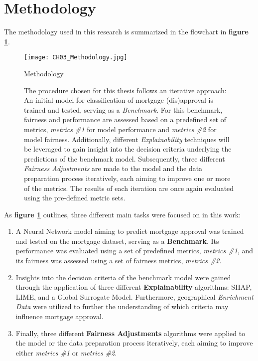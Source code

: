 \section{Methodology}\label{sec:Methodology}

The methodology used in this research is summarized in the flowchart in \textbf{figure \ref{fig:CH03_Methodology}}. 

\begin{figure}[h]
    \centering
    \texttt{[image: CH03\_Methodology.jpg]}
    \caption{Methodology}
    \caption*{The procedure chosen for this thesis follows an iterative approach: An initial model for classification of mortgage (dis)approval is trained and tested, serving as a \textit{Benchmark}. For this benchmark, fairness and performance are assessed based on a predefined set of metrics, \textit{metrics \#1} for model performance and \textit{metrics \#2} for model fairness. Additionally, different \textit{Explainability} techniques will be leveraged to gain insight into the decision criteria underlying the predictions of the benchmark model. Subsequently, three different \textit{Fairness Adjustments} are made to the model and the data preparation process iteratively, each aiming to improve one or more of the metrics. The results of each iteration are once again evaluated using the pre-defined metric sets.}
    \label{fig:CH03_Methodology}
\end{figure}

As \textbf{figure \ref{fig:CH03_Methodology}} outlines, three different main tasks were focused on in this work:

\begin{enumerate}
    \item A Neural Network model aiming to predict mortgage approval was trained and tested on the mortgage dataset, serving as a \textbf{Benchmark}. Its performance was evaluated using a set of predefined metrics, \textit{metrics \#1}, and its fairness was assessed using a set of fairness metrics, \textit{metrics \#2}.
    \item Insights into the decision criteria of the benchmark model were gained through the application of three different \textbf{Explainability} algorithms: SHAP, LIME, and a Global Surrogate Model. Furthermore, geographical \textit{Enrichment Data} were utilized to further the understanding of which criteria may influence mortgage approval.
    \item Finally, three different \textbf{Fairness Adjustments} algorithms were applied to the model or the data preparation process iteratively, each aiming to improve either \textit{metrics \#1} or \textit{metrics \#2}. 
\end{enumerate}


